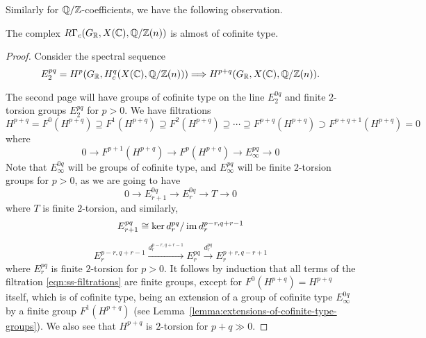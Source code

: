 \documentclass{article}
\numberwithin{equation}{section}
\begin{document}
Similarly for $\mathbb{Q}/\mathbb{Z}$-coefficients, we have the following observation.

\begin{lemma}
  \label{lemma:RGammac(GR,X(C),Q/Z(n))-almost-cofinite-type}
  The complex $R\Gamma_c (G_{\mathbb{R}}, X (\mathbb{C}), \mathbb{Q}/\mathbb{Z} (n))$
  is almost of cofinite type.

  \begin{proof}
    Consider the spectral sequence
    \[ E_2^{pq} = H^p (G_{\mathbb{R}}, H^q_c (X (\mathbb{C}), \mathbb{Q}/\mathbb{Z} (n)))
    \Longrightarrow
    H^{p+q} (G_{\mathbb{R}}, X (\mathbb{C}), \mathbb{Q}/\mathbb{Z} (n)). \]

    The second page will have groups of cofinite type on the line $E_2^{0q}$ and
    finite $2$-torsion groups $E_2^{pq}$ for $p > 0$. We have filtrations
    \begin{equation}
      \label{eqn:ss-filtrations}
      H^{p+q} = F^0 (H^{p+q}) \supseteq
      F^1 (H^{p+q}) \supseteq
      F^2 (H^{p+q}) \supseteq \cdots \supseteq
      F^{p+q} (H^{p+q}) \supset F^{p+q+1} (H^{p+q}) = 0
    \end{equation}
    where
    $$0 \to F^{p+1} (H^{p+q}) \to F^p (H^{p+q}) \to E_\infty^{pq} \to 0$$
    Note that $E^{0q}_\infty$ will be groups of cofinite type, and
    $E^{pq}_\infty$ will be finite $2$-torsion groups for $p > 0$, as we are
    going to have
    $$0 \to E_{r+1}^{0q} \to E_r^{0q} \to T \to 0$$
    where $T$ is finite $2$-torsion, and similarly,
    $$E_{r+1}^{pq} \cong \ker d_r^{pq} / \operatorname{im} d_r^{p-r,q+r-1}$$

    \[ E_r^{p-r,q+r-1} \xrightarrow{d_r^{p-r,q+r-1}}
    E_r^{pq} \xrightarrow{d_r^{pq}} E_r^{p+r,q-r+1} \]
    where $E_r^{pq}$ is finite $2$-torsion for $p > 0$. It follows by induction
    that all terms of the filtration \eqref{eqn:ss-filtrations} are finite
    groups, except for $F^0 (H^{p+q}) = H^{p+q}$ itself, which is of cofinite
    type, being an extension of a group of cofinite type $E_\infty^{0q}$ by a
    finite group $F^1 (H^{p+q})$ (see
    Lemma~\ref{lemma:extensions-of-cofinite-type-groups}). We also see that
    $H^{p+q}$ is $2$-torsion for $p+q \gg 0$.
  \end{proof}
\end{lemma}
\end{document}

